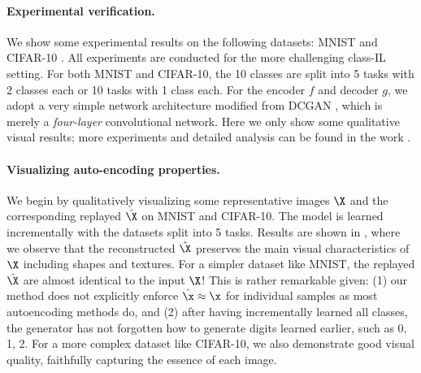 \documentclass[../../book-main.tex]{subfiles}
\begin{document}
\paragraph{Experimental verification.}
We show some experimental results on the following datasets: MNIST
\cite{lecun1998gradient} and CIFAR-10 \cite{krizhevsky2014cifar}. All
experiments are conducted for the more challenging class-IL setting.
For both MNIST and CIFAR-10, the 10 classes are split into 5 tasks
with 2 classes each or 10 tasks with 1 class each. For the encoder
$f$ and decoder $g$, we adopt a very simple network architecture
modified from DCGAN \cite{radford2016unsupervised}, which is merely a
{\em four-layer} convolutional network. Here we only show some
qualitative visual results; more experiments and detailed analysis
can be found in the work \cite{tong2023incremental}.

\paragraph{Visualizing auto-encoding properties.}
We begin by qualitatively visualizing some representative images $\X$
and the corresponding replayed $\hat{\X}$ on MNIST and CIFAR-10. The
model is learned incrementally with the datasets split into 5 tasks.
Results are shown in ,
where we observe that the reconstructed $\hat{\X}$ preserves the main
visual characteristics of $\X$ including shapes and textures. For a
simpler dataset like MNIST, the replayed $\hat{\X}$ are almost
identical to the input $\X$! This is rather remarkable given: (1) our
method does not explicitly enforce $\hat{\x} \approx \x$ for
individual samples as most autoencoding methods do, and (2) after
having incrementally learned all classes, the generator has not
forgotten how to generate digits learned earlier, such as 0, 1, 2.
For a more complex dataset like CIFAR-10, we also demonstrate good
visual quality, faithfully capturing the essence of each image.
\end{document}
